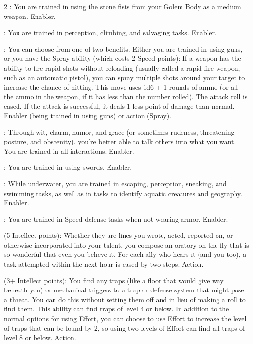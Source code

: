 \begin{multicols}{2}
: You are trained in using the stone fists from your Golem Body as a medium weapon. Enabler. 
 
: You are trained in perception, climbing, and salvaging tasks. Enabler. 
 
: You can choose from one of two benefits. Either you are trained in using guns, or you have the Spray ability (which costs 2 Speed points): If a weapon has the ability to fire rapid shots without reloading (usually called a rapid-fire weapon, such as an automatic pistol), you can spray multiple shots around your target to increase the chance of hitting. This move uses 1d6 + 1 rounds of ammo (or all the ammo in the weapon, if it has less than the number rolled). The attack roll is eased. If the attack is successful, it deals 1 less point of damage than normal. Enabler (being trained in using guns) or action (Spray). 
 
: Through wit, charm, humor, and grace (or sometimes rudeness, threatening posture, and obscenity), you’re better able to talk others into what you want. You are trained in all interactions. Enabler. 
 
: You are trained in using swords. Enabler. 
 
: While underwater, you are trained in escaping, perception, sneaking, and swimming tasks, as well as in tasks to identify aquatic creatures and geography. Enabler. 
 
: You are trained in Speed defense tasks when not wearing armor. Enabler. 
 
 (5 Intellect points): Whether they are lines you wrote, acted, reported on, or otherwise incorporated into your talent, you compose an oratory on the fly that is so wonderful that even you believe it. For each ally who hears it (and you too), a task attempted within the next hour is eased by two steps. Action. 
 
 (3+ Intellect points): You find any traps (like a floor that would give way beneath you) or mechanical triggers to a trap or defense system that might pose a threat. You can do this without setting them off and in lieu of making a roll to find them. This ability can find traps of level 4 or below. In addition to the normal options for using Effort, you can choose to use Effort to increase the level of traps that can be found by 2, so using two levels of Effort can find all traps of level 8 or below. Action. 
 

\end{multicols}
